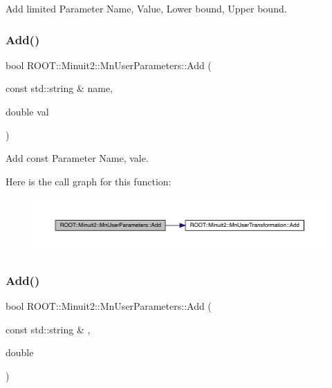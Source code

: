 Add limited Parameter Name, Value, Lower bound, Upper bound. 

\mbox{\label{classROOT_1_1Minuit2_1_1MnUserParameters_acb750b2b34d2a7a233f559d6820bbb35}} 
\subsubsection{\texorpdfstring{Add()}{Add()}\hspace{0.1cm}{\footnotesize\ttfamily [7/9]}}
{\footnotesize\ttfamily bool R\+O\+O\+T\+::\+Minuit2\+::\+Mn\+User\+Parameters\+::\+Add (\begin{DoxyParamCaption}\item[{const std\+::string \&}]{name,  }\item[{double}]{val }\end{DoxyParamCaption})}



Add const Parameter Name, vale. 

Here is the call graph for this function\+:
\nopagebreak
\begin{figure}[H]
\begin{center}
\leavevmode
\includegraphics[width=350pt]{d6/d10/classROOT_1_1Minuit2_1_1MnUserParameters_acb750b2b34d2a7a233f559d6820bbb35_cgraph}
\end{center}
\end{figure}
\mbox{\label{classROOT_1_1Minuit2_1_1MnUserParameters_acb750b2b34d2a7a233f559d6820bbb35}} 
\subsubsection{\texorpdfstring{Add()}{Add()}\hspace{0.1cm}{\footnotesize\ttfamily [8/9]}}
{\footnotesize\ttfamily bool R\+O\+O\+T\+::\+Minuit2\+::\+Mn\+User\+Parameters\+::\+Add (\begin{DoxyParamCaption}\item[{const std\+::string \&}]{,  }\item[{double}]{ }\end{DoxyParamCaption})}



